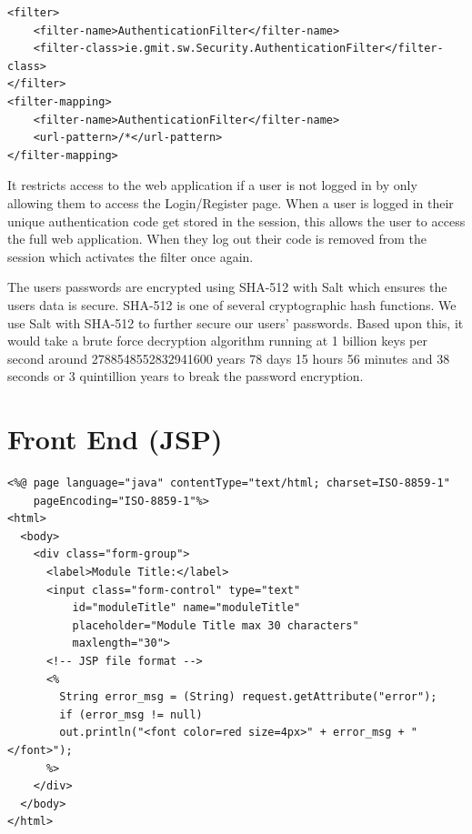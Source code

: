 \begin{verbatim}
<filter>
    <filter-name>AuthenticationFilter</filter-name>
    <filter-class>ie.gmit.sw.Security.AuthenticationFilter</filter-class>
</filter>
<filter-mapping>
    <filter-name>AuthenticationFilter</filter-name>
    <url-pattern>/*</url-pattern>
</filter-mapping>
\end{verbatim}
It restricts access to the web application if a user is not logged in by only allowing them to access the Login/Register page. When a user is logged in their unique authentication code get stored in the session, this allows the user to access the full web application. When they log out their code is removed from the session which activates the filter once again.\\

\par The users passwords are encrypted using SHA-512 with Salt which ensures the users data is secure. SHA-512 is one of several cryptographic hash functions. We use Salt with SHA-512 to further secure our users' passwords. Based upon this, it would take a brute force decryption algorithm running at 1 billion keys per second around 2788548552832941600 years 78 days 15 hours 56 minutes and 38 seconds or 3 quintillion years to break the password encryption.

\section{Front End (JSP)}


\begin{verbatim}
<%@ page language="java" contentType="text/html; charset=ISO-8859-1"
	pageEncoding="ISO-8859-1"%>
<html>
  <body>
    <div class="form-group">
      <label>Module Title:</label>
      <input class="form-control" type="text" 
          id="moduleTitle" name="moduleTitle" 
          placeholder="Module Title max 30 characters" 
          maxlength="30">
      <!-- JSP file format -->
      <%
        String error_msg = (String) request.getAttribute("error");
        if (error_msg != null)
        out.println("<font color=red size=4px>" + error_msg + "</font>");
      %>
    </div>
  </body>
</html>
\end{verbatim}


